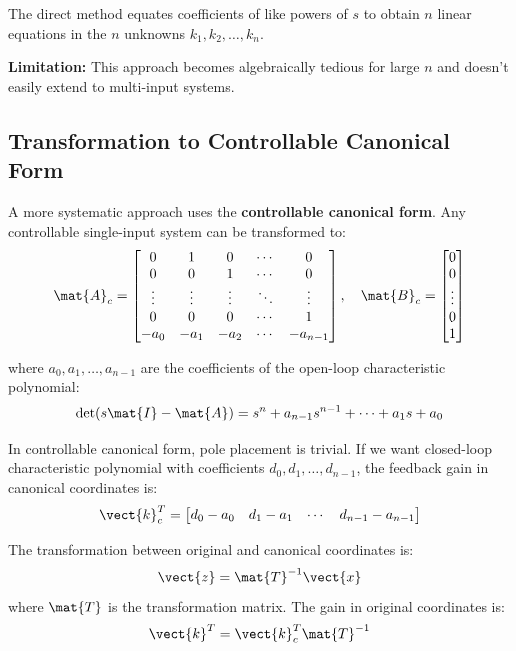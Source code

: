 The direct method equates coefficients of like powers of $s$ to obtain $n$ linear equations in the $n$ unknowns $k_1, k_2, \ldots, k_n$.

\textbf{Limitation:} This approach becomes algebraically tedious for large $n$ and doesn't easily extend to multi-input systems.

\subsection{Transformation to Controllable Canonical Form}

A more systematic approach uses the \textbf{controllable canonical form}. Any controllable single-input system can be transformed to:
\begin{equation}
\mat{A}_c = \begin{bmatrix}
0 & 1 & 0 & \cdots & 0 \\
0 & 0 & 1 & \cdots & 0 \\
\vdots & \vdots & \vdots & \ddots & \vdots \\
0 & 0 & 0 & \cdots & 1 \\
-a_0 & -a_1 & -a_2 & \cdots & -a_{n-1}
\end{bmatrix}, \quad
\mat{B}_c = \begin{bmatrix} 0 \\ 0 \\ \vdots \\ 0 \\ 1 \end{bmatrix}
\label{eq:controllable_canonical_form}
\end{equation}

where $a_0, a_1, \ldots, a_{n-1}$ are the coefficients of the open-loop characteristic polynomial:
\begin{equation}
\det(s\mat{I} - \mat{A}) = s^n + a_{n-1}s^{n-1} + \cdots + a_1 s + a_0
\end{equation}

In controllable canonical form, pole placement is trivial. If we want closed-loop characteristic polynomial with coefficients $d_0, d_1, \ldots, d_{n-1}$, the feedback gain in canonical coordinates is:
\begin{equation}
\vect{k}_c^T = \begin{bmatrix} d_0 - a_0 & d_1 - a_1 & \cdots & d_{n-1} - a_{n-1} \end{bmatrix}
\label{eq:gain_canonical}
\end{equation}

The transformation between original and canonical coordinates is:
\begin{equation}
\vect{z} = \mat{T}^{-1}\vect{x}
\end{equation}
where $\mat{T}$ is the transformation matrix. The gain in original coordinates is:
\begin{equation}
\vect{k}^T = \vect{k}_c^T \mat{T}^{-1}
\label{eq:gain_transformation}
\end{equation}

